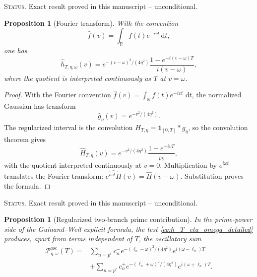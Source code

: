 \documentclass[11pt]{amsart}
\numberwithin{equation}{section}
\theoremstyle{plain}
\newtheorem{proposition}[theorem]{Proposition}
\theoremstyle{definition}
\theoremstyle{remark}
\newcommand{\1}{\mathbf{1}}
\newcommand{\dd}{\,\mathrm{d}}
\newcommand{\cP}{\mathcal P}
\newcommand{\statusnote}[1]{%
  \par\smallskip\noindent
  \begingroup\footnotesize\textsc{Status.} #1\endgroup
  \par\smallskip}
\begin{document}
\statusnote{Exact result proved in this manuscript -- unconditional.}
\begin{proposition}[Fourier transform]
\label{prop:gaussian_fourier_transform}
With the convention
\begin{equation}
\widehat f(v)=\int_{\mathbb R}f(t)e^{-ivt}\dd t,
\label{eq:fourier_convention}
\end{equation}
one has
\begin{equation}
\boxed{
\widehat h_{T,\eta,\omega}(v)
=
e^{-(v-\omega)^2/(4\eta^2)}
\frac{1-e^{-i(v-\omega)T}}{i(v-\omega)},
}
\label{eq:exact_gaussian_fourier_transform}
\end{equation}
where the quotient is interpreted continuously as $T$ at $v=\omega$.
\end{proposition}

\begin{proof}
With the Fourier convention
\(\widehat f(v)=\int_{\mathbb R}f(t)e^{-ivt}\,\dd t\), the normalized
Gaussian has transform
\begin{equation}
\widehat g_\eta(v)=e^{-v^2/(4\eta^2)}.
\label{eq:gaussian_transform_proof}
\end{equation}
The regularized interval is the convolution
\(H_{T,\eta}=\1_{[0,T]}*g_\eta\), so the convolution theorem gives
\begin{equation}
\widehat H_{T,\eta}(v)
=
e^{-v^2/(4\eta^2)}
\frac{1-e^{-ivT}}{iv},
\label{eq:interval_gaussian_transform_proof}
\end{equation}
with the quotient interpreted continuously at \(v=0\).  Multiplication by
\(e^{i\omega t}\) translates the Fourier transform:
\(\widehat{e^{i\omega t}H}(v)=\widehat H(v-\omega)\).  Substitution proves
the formula.
\end{proof}

\statusnote{Exact result proved in this manuscript -- unconditional.}
\begin{proposition}[Regularized two-branch prime contribution]
\label{prop:regularized_two_branches}
In the prime-power side of the Guinand--Weil explicit formula, the test
\eqref{eq:h_T_eta_omega_detailed} produces, apart from terms independent of
$T$, the oscillatory sum
\begin{align}
\cP_{\eta,\omega}^{\mathrm{osc}}(T)
={}&
\sum_{n=p^r}
c_n^-e^{-(\ell_n-\omega)^2/(4\eta^2)}
e^{i(\omega-\ell_n)T}
\label{eq:regularized_minus_branch}
\\
&+
\sum_{n=p^r}
c_n^+e^{-(\ell_n+\omega)^2/(4\eta^2)}
e^{i(\omega+\ell_n)T}.
\label{eq:regularized_plus_branch}
\end{align}
\end{proposition}
\end{document}
